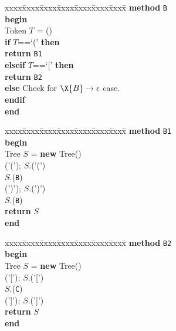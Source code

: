 \begin{figure}[p]
\hspace*{.8in}\begin{minipage}{5in}
\begin{tabbing}
xxxx\=xxxx\=xxxx\=xxxx\=xxxx\=xxxx\=xxxx\= \kill
\textbf{method} \texttt{B}\\ 
\textbf{begin} \\
\> Token $T$ = ()\\
\> \textbf{if} $T$==`(' \textbf{then}\\
\> \> \textbf{return} \texttt{B1}\\
\> \textbf{elseif} $T$==`[' \textbf{then}\\
\> \> \textbf{return} \texttt{B2}\\
\> \textbf{else} Check for $\X{B} \rightarrow \epsilon$ case.\\
\> \textbf{endif}\\
\textbf{end} 
\end{tabbing}

\begin{tabbing}
xxxx\=xxxx\=xxxx\=xxxx\=xxxx\=xxxx\=xxxx\= \kill
\textbf{method} \texttt{B1} \\
\textbf{begin}\\
\> Tree $S$ = \textbf{new} Tree()\\
\> ('('); $S$.('(')\\
\> $S$.(\texttt{B})\\
\> (')'); $S$.(')')\\
\> $S$.(\texttt{B})\\
\> \textbf{return} $S$\\
\textbf{end} 
\end{tabbing}

\begin{tabbing}
xxxx\=xxxx\=xxxx\=xxxx\=xxxx\=xxxx\=xxxx\= \kill
\textbf{method} \texttt{B2} \\
\textbf{begin}\\
\> Tree $S$ = \textbf{new} Tree()\\
\> ('['); $S$.('[')\\
\> $S$.(\texttt{C})\\
\> (']'); $S$.(']')\\
\> \textbf{return} $S$\\
\textbf{end} 
\end{tabbing}


\end{minipage}
\end{figure}
